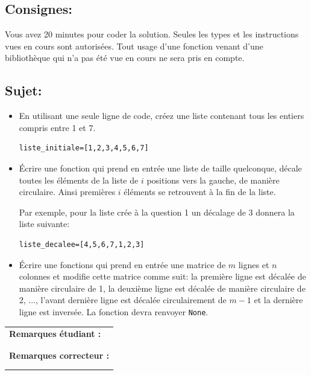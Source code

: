 \documentclass[a4paper,11pt]{article}
\begin{document}
\subsection*{Consignes:} Vous avez 20 minutes pour coder la solution. Seules les types et les instructions vues en cours sont autorisées. Tout usage d'une fonction 
venant d'une bibliothèque qui n'a pas été vue en cours ne sera pris en compte. 


\subsection*{Sujet:}

\begin{itemize}
\item[1.] En utilisant une seule ligne de code, créez une liste contenant tous les entiers compris entre 1 et 7. 
\begin{verbatim}
liste_initiale=[1,2,3,4,5,6,7]
\end{verbatim}

\item[2.] \'Ecrire une fonction qui prend en entrée une liste de taille quelconque, décale toutes les éléments de la liste de $i$ positions vers la gauche, de manière circulaire.   Ainsi premières $i$ éléments se 
retrouvent à la fin de la liste. 

Par exemple, pour la liste crée à la question 1 un décalage de 3 donnera la liste suivante:

\begin{verbatim}
liste_decalee=[4,5,6,7,1,2,3]
\end{verbatim}

\item[3.] \'Ecrire une fonctions qui prend en entrée une matrice de $m$ lignes et $n$ colonnes et modifie cette matrice comme suit:  la première ligne est décalée de manière circulaire de 1, la deuxième ligne est décalée de manière circulaire de 2, ..., 
l'avant dernière ligne est décalée circulairement de $m-1$ et la dernière ligne est inversée. 
La fonction devra renvoyer  \texttt{None}. 
\end{itemize}

\begin{table}[h!]
\centering
\renewcommand{\arraystretch}{1.4} %
\begin{tabular}{|p{15cm}|}
\hline
\textbf{Remarques étudiant :}    \\
 \\
 \\
\hline
\textbf{Remarques correcteur :}  \\
 \\
 \\
\hline
\end{tabular}
\end{table}
\end{document}
